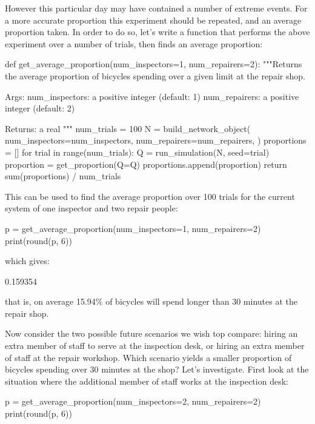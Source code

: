 However this particular day may have contained a number of extreme events.
For a more accurate proportion this experiment should be repeated, and an
average proportion taken.
In order to do so, let's write a function that performs the above experiment
over a number of trials, then finds an average proportion:

\begin{pyin}
def get_average_proportion(num_inspectors=1, num_repairers=2):
    """Returns the average proportion of bicycles spending over
    a given limit at the repair shop.

    Args:
        num_inspectors: a positive integer (default: 1)
        num_repairers: a positive integer (default: 2)

    Returns:
        a real
    """
    num_trials = 100
    N = build_network_object(
        num_inspectors=num_inspectors,
        num_repairers=num_repairers,
    )
    proportions = []
    for trial in range(num_trials):
        Q = run_simulation(N, seed=trial)
        proportion = get_proportion(Q=Q)
        proportions.append(proportion)
    return sum(proportions) / num_trials
\end{pyin}

This can be used to find the average proportion over 100 trials for the current
system of one inspector and two repair people:

\begin{pyin}
p = get_average_proportion(num_inspectors=1, num_repairers=2)
print(round(p, 6))
\end{pyin}

which gives:

\begin{pyout}
0.159354
\end{pyout}

that is, on average 15.94\% of bicycles will spend longer than 30 minutes at the
repair shop.

Now consider the two possible future scenarios we wish top compare: hiring an
extra member of staff to serve at the inspection desk, or hiring an extra member
of staff at the repair workshop. Which scenario yields a smaller proportion of
bicycles spending over 30 minutes at the shop? Let's investigate. First look at
the situation where the additional member of staff works at the inspection desk:

\begin{pyin}
p = get_average_proportion(num_inspectors=2, num_repairers=2)
print(round(p, 6))
\end{pyin}


